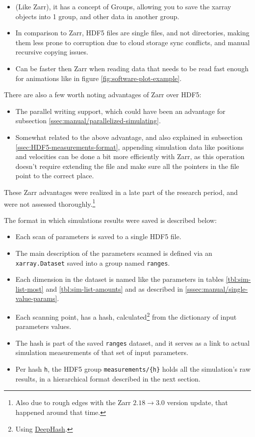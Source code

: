\begin{itemize}
	\item (Like Zarr), it has a concept of Groups, allowing you to save the xarray objects into 1 group, and other data in another group.
	\item In comparison to Zarr, HDF5 files are single files, and not directories, making them less prone to corruption due to cloud storage sync conflicts, and manual recursive copying issues.
	\item Can be faster then Zarr when reading data that needs to be read fast enough for animations like in figure \ref{fig:software-plot-example}.
\end{itemize}

There are also a few worth noting advantages of Zarr over HDF5:

\begin{itemize}
	\item The parallel writing support, which could have been an advantage for subsection \ref{ssec:manual/parallelized-simulating}.
	\item Somewhat related to the above advantage, and also explained in subsection \ref{ssec:HDF5-measurements-format}, appending simulation data like positions and velocities can be done a bit more efficiently with Zarr, as this operation doesn't require extending the file and make sure all the pointers in the file point to the correct place.
\end{itemize}

These Zarr advantages were realized in a late part of the research period, and were not assessed thoroughly.\footnote{Also due to rough edges with the Zarr $2.18 \rightarrow 3.0$ version update, that happened around that time.}

The format in which simulations results were saved is described below:

\begin{itemize}
	\item Each scan of parameters is saved to a single HDF5 file.
	\item The main description of the parameters scanned is defined via an \texttt{xarray.Dataset} saved into a group named \texttt{ranges}.
	\item Each dimension in the dataset is named like the parameters in tables \ref{tbl:sim-list-most} and \ref{tbl:sim-list-amounts} and as described in \ref{sssec:manual/single-value-params}.
	\item Each scanning point, has a hash, calculated\footnote{Using \href{https://zepworks.com/deepdiff/current/deephash.html}{DeepHash}.} from the dictionary of input parameters values.
	\item The hash is part of the saved \texttt{ranges} dataset, and it serves as a link to actual simulation measurements of that set of input parameters.
	\item Per hash \texttt{h}, the HDF5 group \texttt{measurements/\{h\}} holds all the simulation's raw results, in a hierarchical format described in the next section.
\end{itemize}

